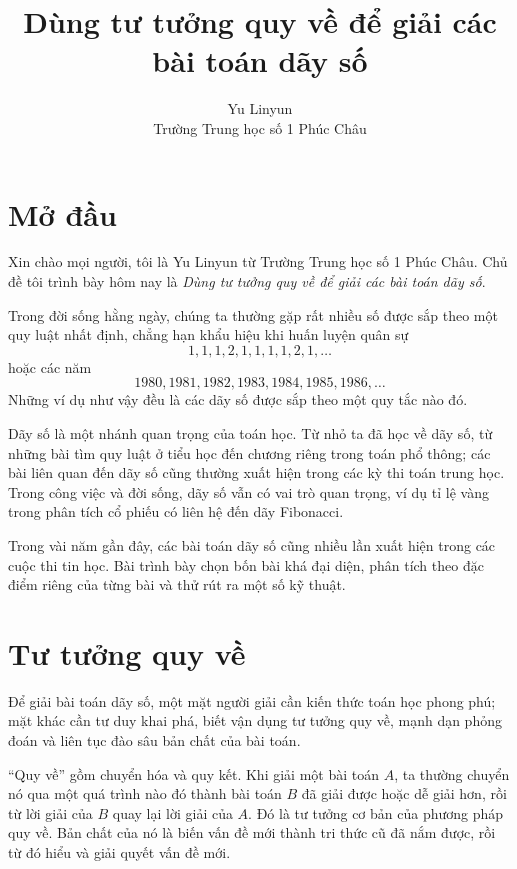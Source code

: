 \documentclass[11pt]{article}
\title{Dùng tư tưởng quy về để giải các bài toán dãy số}
\author{Yu Linyun\\Trường Trung học số 1 Phúc Châu}
\date{}
\begin{document}
\maketitle


\section{Mở đầu}

Xin chào mọi người, tôi là Yu Linyun từ Trường Trung học số 1 Phúc Châu. Chủ
đề tôi trình bày hôm nay là \emph{Dùng tư tưởng quy về để giải các bài toán
dãy số}.

Trong đời sống hằng ngày, chúng ta thường gặp rất nhiều số được sắp theo một
quy luật nhất định, chẳng hạn khẩu hiệu khi huấn luyện quân sự
\[
  1,1,1,2,1,1,1,1,2,1,\ldots
\]
hoặc các năm
\[
  1980,1981,1982,1983,1984,1985,1986,\ldots
\]
Những ví dụ như vậy đều là các dãy số được sắp theo một quy tắc nào đó.

Dãy số là một nhánh quan trọng của toán học. Từ nhỏ ta đã học về dãy số, từ
những bài tìm quy luật ở tiểu học đến chương riêng trong toán phổ thông; các
bài liên quan đến dãy số cũng thường xuất hiện trong các kỳ thi toán trung
học. Trong công việc và đời sống, dãy số vẫn có vai trò quan trọng, ví dụ tỉ
lệ vàng trong phân tích cổ phiếu có liên hệ đến dãy Fibonacci.

Trong vài năm gần đây, các bài toán dãy số cũng nhiều lần xuất hiện trong
các cuộc thi tin học. Bài trình bày chọn bốn bài khá đại diện, phân tích theo
đặc điểm riêng của từng bài và thử rút ra một số kỹ thuật.

\section{Tư tưởng quy về}

Để giải bài toán dãy số, một mặt người giải cần kiến thức toán học phong phú;
mặt khác cần tư duy khai phá, biết vận dụng tư tưởng quy về, mạnh dạn phỏng
đoán và liên tục đào sâu bản chất của bài toán.

``Quy về'' gồm chuyển hóa và quy kết. Khi giải một bài toán \(A\), ta thường
chuyển nó qua một quá trình nào đó thành bài toán \(B\) đã giải được hoặc dễ
giải hơn, rồi từ lời giải của \(B\) quay lại lời giải của \(A\). Đó là tư
tưởng cơ bản của phương pháp quy về. Bản chất của nó là biến vấn đề mới
thành tri thức cũ đã nắm được, rồi từ đó hiểu và giải quyết vấn đề mới.
\end{document}
